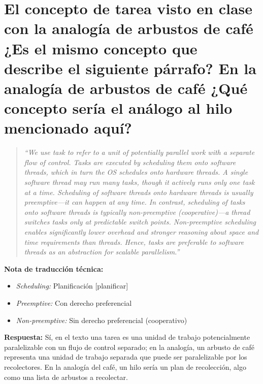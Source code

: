 \documentclass[11pt,a4paper]{article}
\begin{document}
\section{El concepto de tarea visto en clase con la analogía de arbustos de café ¿Es el mismo concepto que describe el siguiente párrafo? En la analogía de arbustos de café ¿Qué concepto sería el análogo al hilo mencionado aquí?}


\begin{quote}
\small
\textit{``We use task to refer to a unit of potentially parallel work with a separate flow of control. Tasks are executed by scheduling them onto software threads, which in turn the OS schedules onto hardware threads. A single software thread may run many tasks, though it actively runs only one task at a time. Scheduling of software threads onto hardware threads is usually preemptive---it can happen at any time. In contrast, scheduling of tasks onto software threads is typically non-preemptive (cooperative)---a thread switches tasks only at predictable switch points. Non-preemptive scheduling enables significantly lower overhead and stronger reasoning about space and time requirements than threads. Hence, tasks are preferable to software threads as an abstraction for scalable parallelism.''}
\end{quote}

\noindent\textbf{Nota de traducción técnica:}
\begin{itemize}[itemsep=0.2em]
    \item \textit{Scheduling:} Planificación [planificar]
    \item \textit{Preemptive:} Con derecho preferencial
    \item \textit{Non-preemptive:} Sin derecho preferencial (cooperativo)
\end{itemize}

\vspace{0.8em}
\noindent\textbf{Respuesta:}
Sí, en el texto una tarea es una unidad de trabajo potencialmente paralelizable con un flujo de control separado; en la analogía, un arbusto de café representa una unidad de trabajo separada que puede ser paralelizable por los recolectores. En la analogía del café, un hilo sería un plan de recolección, algo como una lista de arbustos a recolectar.


\vspace{1.5em}
\end{document}
